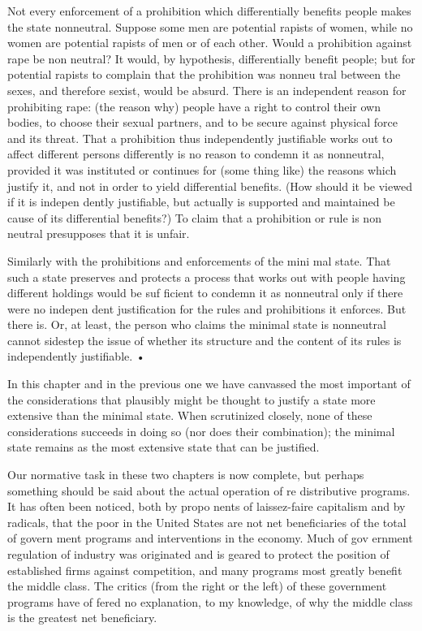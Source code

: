 \documentclass[11pt,openany]{book}
\begin{document}
Not every enforcement of a prohibition which differentially benefits people makes the state nonneutral. Suppose some men are potential rapists of women, while no women are potential rapists of men or of each other. Would a prohibition against rape be non neutral? It would, by hypothesis, differentially benefit people; but for potential rapists to complain that the prohibition was nonneu tral between the sexes, and therefore sexist, would be absurd. There is an independent reason for prohibiting rape: (the reason why) people have a right to control their own bodies, to choose their sexual partners, and to be secure against physical force and its threat. That a prohibition thus independently justifiable works out to affect different persons differently is no reason to condemn it as nonneutral, provided it was instituted or continues for (some thing like) the reasons which justify it, and not in order to yield differential benefits. (How should it be viewed if it is indepen dently justifiable, but actually is supported and maintained be cause of its differential benefits?) To claim that a prohibition or rule is non neutral presupposes that it is unfair. 

Similarly with the prohibitions and enforcements of the mini mal state. That such a state preserves and protects a process that works out with people having different holdings would be suf ficient to condemn it as nonneutral only if there were no indepen dent justification for the rules and prohibitions it enforces. But there is. Or, at least, the person who claims the minimal state is nonneutral cannot sidestep the issue of whether its structure and the content of its rules is independently justifiable. • 

In this chapter and in the previous one we have canvassed the most important of the considerations that plausibly might be thought to justify a state more extensive than the minimal state. When scrutinized closely, none of these considerations succeeds in doing so (nor does their combination); the minimal state remains as the most extensive state that can be justified. 

Our normative task in these two chapters is now complete, but perhaps something should be said about the actual operation of re distributive programs. It has often been noticed, both by propo nents of laissez-faire capitalism and by radicals, that the poor in the United States are not net beneficiaries of the total of govern ment programs and interventions in the economy. Much of gov ernment regulation of industry was originated and is geared to protect the position of established firms against competition, and many programs most greatly benefit the middle class. The critics (from the right or the left) of these government programs have of fered no explanation, to my knowledge, of why the middle class is the greatest net beneficiary. 
\end{document}

